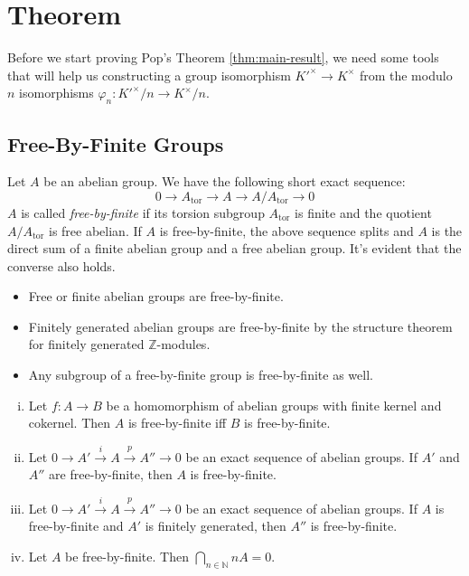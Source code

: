 \chapter{Theorem}

Before we start proving Pop's Theorem \ref{thm:main-result}, we need some tools that will help us constructing a group isomorphism $K'^\times\to K^\times$ from the modulo $n$ isomorphisms $\varphi_n: K'^\times/n\to K^\times/n$.

\section{Free-By-Finite Groups}

\begin{definition}\label{5.1}
Let $A$ be an abelian group. We have the following short exact sequence:
\[0\longrightarrow A_\text{tor} \longrightarrow A\longrightarrow A/A_\text{tor}\longrightarrow 0 \]
$A$ is called \textit{free-by-finite} if its torsion subgroup $A_\text{tor}$ is finite and the quotient $A/A_\text{tor}$ is free abelian. If $A$ is free-by-finite, the above sequence splits and $A$ is the direct sum of a finite abelian group and a free abelian group. It's evident that the converse also holds.
\end{definition}

\begin{example}
\begin{itemize}
\item Free or finite abelian groups are free-by-finite.
\item Finitely generated abelian groups are free-by-finite by the structure theorem for finitely generated $\mathbb{Z}$-modules.
\item Any subgroup of a free-by-finite group is free-by-finite as well.
\end{itemize}
\end{example}

\begin{lemma}\label{5.2}
\begin{enumerate}[(i)]
\item Let $f: A\to B$ be a homomorphism of abelian groups with finite kernel and cokernel. Then $A$ is free-by-finite iff $B$ is free-by-finite.
\item Let $0\longrightarrow A'\stackrel{i}{\longrightarrow}A\stackrel{p}{\longrightarrow}A''\longrightarrow 0$ be an exact sequence of abelian groups. If $A'$ and $A''$ are free-by-finite, then $A$ is free-by-finite. 
\item Let $0\longrightarrow A'\stackrel{i}{\longrightarrow}A\stackrel{p}{\longrightarrow}A''\longrightarrow 0$ be an exact sequence of abelian groups. If $A$ is free-by-finite and $A'$ is finitely generated, then $A''$ is free-by-finite.
\item Let $A$ be free-by-finite. Then $\bigcap_{n\in\mathbb{N}}nA=0$.
\end{enumerate}
\end{lemma}

